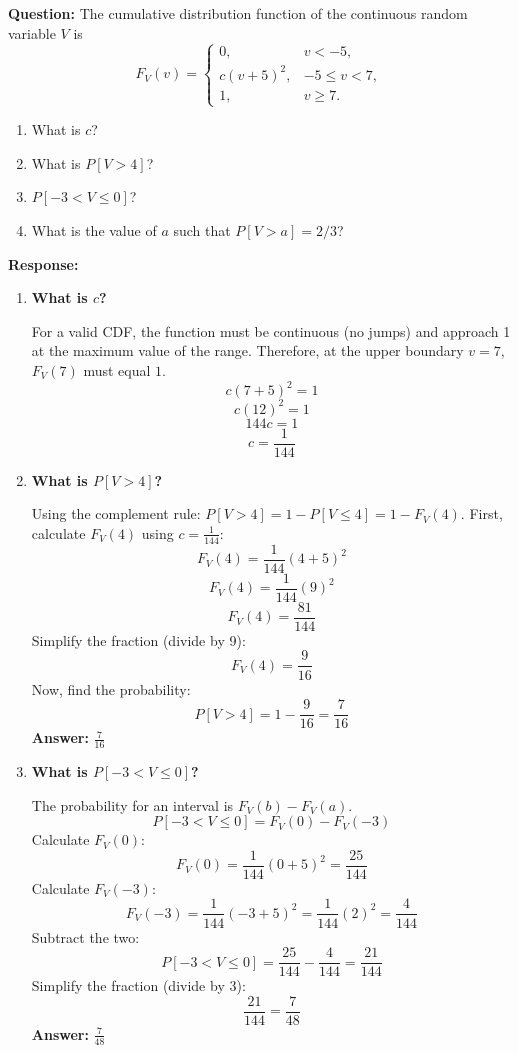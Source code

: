 \documentclass[12pt]{article}
\begin{document}
\begin{enumerate}[label=\textbf{\arabic*.}, leftmargin=*]
\textbf{Question:} The cumulative distribution function of the continuous random variable $V$ is
\[
F_V(v) = \begin{cases}
0, & v < -5, \\
c(v+5)^2, & -5 \le v < 7, \\
1, & v \ge 7.
\end{cases}
\]
\begin{enumerate}[label=(\alph*)]
    \item What is $c$?
    \item What is $P[V > 4]$?
    \item $P[-3 < V \le 0]$?
    \item What is the value of $a$ such that $P[V > a] = 2/3$?
\end{enumerate}

\vspace{0.3in}

\textbf{Response:}

\begin{enumerate}[label=(\alph*)]
    \item \textbf{What is $c$?}

    For a valid CDF, the function must be continuous (no jumps) and approach 1 at the maximum value of the range.
    Therefore, at the upper boundary $v = 7$, $F_V(7)$ must equal $1$.
    \[ c(7 + 5)^2 = 1 \]
    \[ c(12)^2 = 1 \]
    \[ 144c = 1 \]
    \[ c = \frac{1}{144} \]

    \item \textbf{What is $P[V > 4]$?}

    Using the complement rule: $P[V > 4] = 1 - P[V \le 4] = 1 - F_V(4)$.
    First, calculate $F_V(4)$ using $c = \frac{1}{144}$:
    \[ F_V(4) = \frac{1}{144}(4 + 5)^2 \]
    \[ F_V(4) = \frac{1}{144}(9)^2 \]
    \[ F_V(4) = \frac{81}{144} \]
    Simplify the fraction (divide by 9):
    \[ F_V(4) = \frac{9}{16} \]
    Now, find the probability:
    \[ P[V > 4] = 1 - \frac{9}{16} = \frac{7}{16} \]
    \textbf{Answer:} $\frac{7}{16}$

    \item \textbf{What is $P[-3 < V \le 0]$?}

    The probability for an interval is $F_V(b) - F_V(a)$.
    \[ P[-3 < V \le 0] = F_V(0) - F_V(-3) \]
    Calculate $F_V(0)$:
    \[ F_V(0) = \frac{1}{144}(0 + 5)^2 = \frac{25}{144} \]
    Calculate $F_V(-3)$:
    \[ F_V(-3) = \frac{1}{144}(-3 + 5)^2 = \frac{1}{144}(2)^2 = \frac{4}{144} \]
    Subtract the two:
    \[ P[-3 < V \le 0] = \frac{25}{144} - \frac{4}{144} = \frac{21}{144} \]
    Simplify the fraction (divide by 3):
    \[ \frac{21}{144} = \frac{7}{48} \]
    \textbf{Answer:} $\frac{7}{48}$


\end{enumerate}
\end{enumerate}
\end{document}
